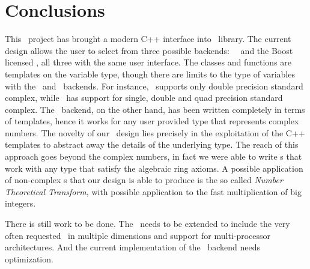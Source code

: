\section{Conclusions}
This \gsoc\ project has brought a modern C++ interface into \boostmath\ library.
The current design allows the user to select from three possible backends:
\gsl\, \fftw\ and the Boost licensed \bsl, all three with the same user
interface. The classes and functions are templates on the variable type, though
there are limits to the type of variables with the \gsl\ and \fftw\ backends.
For instance, \gsl\ supports only double precision standard complex,
while \fftw\ has support for single, double and quad precision standard complex.
The \bsl\ backend, on the other hand, has been written
completely in terms of templates, hence it works for any user provided type that
represents complex numbers. 
The novelty of our \dft\ design lies precisely in
the exploitation of the C++ templates to abstract away the details of the
underlying type. 
The reach of this approach goes beyond the complex numbers, in fact we were able
to write \fft s that work with any type that satisfy the algebraic ring axioms.
A possible application of non-complex \fft s that our design is able to produce
is the so called \emph{Number Theoretical Transform}, with possible application to the
fast multiplication of big integers.


There is still work to be done. The \api\ needs to be extended to include the very
often requested \dft\ in multiple dimensions and support for multi-processor
architectures. And the current implementation of the \bsl\ backend needs
optimization.
